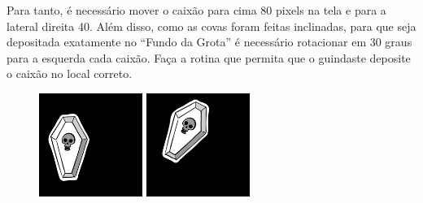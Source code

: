 \documentclass[
	12pt,				%
	oneside,			%
	a4paper,			%
	english,			%
	french,				%
	spanish,			%
	brazil,				%
	]{abntex2}
\begin{document}
\begin{apendicesenv}
Para tanto, é necessário mover o caixão para cima 80 pixels na tela e para a lateral direita 40. Além disso, como as covas foram feitas inclinadas, para que seja depositada exatamente no “Fundo da Grota” é necessário rotacionar em 30 graus para a esquerda cada caixão. Faça a rotina que permita que o guindaste deposite o caixão no local correto.

\begin{figure}[H]
\centering
\includegraphics[width=0.3\textwidth]{imagens/desafios/coffin2d00.jpg}
\includegraphics[width=0.3\textwidth]{imagens/desafios/mission6.png}
\end{figure}

\end{apendicesenv}


\printindex
\end{document}
